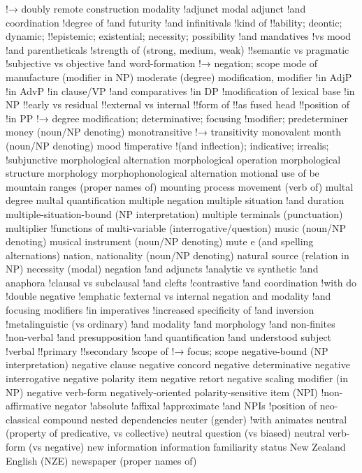 !→ doubly remote construction
modality
!adjunct modal adjunct
!and coordination
!degree of
!and futurity
!and infinitivals
!kind of
!!ability; deontic; dynamic;
!!epistemic; existential; necessity; possibility
!and mandatives
!vs mood
!and parentheticals
!strength of (strong, medium, weak)
!!semantic vs pragmatic
!subjective vs objective
!and word-formation
!→ negation; scope
mode of manufacture (modifier in NP)
moderate (degree)
modification, modifier
!in AdjP
!in AdvP
!in clause/VP
!and comparatives
!in DP
!modification of lexical base
!in NP
!!early vs residual
!!external vs internal
!!form of
!!as fused head
!!position of
!in PP
!→ degree modification; determinative; focusing
!modifier; predeterminer
money (noun/NP denoting)
monotransitive
!→ transitivity
monovalent
month (noun/NP denoting)
mood
!imperative
!(and inflection); indicative; irrealis;
!subjunctive
morphological alternation
morphological operation
morphological structure
morphology
morphophonological alternation
motional use of be
mountain ranges (proper names of)
mounting process
movement (verb of)
multal degree
multal quantification
multiple negation
multiple situation
!and duration
multiple-situation-bound (NP interpretation)
multiple terminals (punctuation)
multiplier
!functions of
multi-variable (interrogative/question)
music (noun/NP denoting)
musical instrument (noun/NP denoting)
mute e (and spelling alternations)
nation, nationality (noun/NP denoting)
natural source (relation in NP)
necessity (modal)
negation
!and adjuncts
!analytic vs synthetic
!and anaphora
!clausal vs subclausal
!and clefts
!contrastive
!and coordination
!with do
!double negative
!emphatic
!external vs internal negation and modality
!and focusing modifiers
!in imperatives
!increased specificity of
!and inversion
!metalinguistic (vs ordinary)
!and modality
!and morphology
!and non-finites
!non-verbal
!and presupposition
!and quantification
!and understood subject
!verbal
!!primary
!!secondary
!scope of
!→ focus; scope
negative-bound (NP interpretation)
negative clause
negative concord
negative determinative
negative interrogative
negative polarity item
negative retort
negative scaling modifier (in NP)
negative verb-form
negatively-oriented polarity-sensitive item (NPI)
!non-affirmative
negator
!absolute
!affixal
!approximate
!and NPIs
!position of
neo-classical compound
nested dependencies
neuter (gender)
!with animates
neutral (property of predicative, vs collective)
neutral question (vs biased)
neutral verb-form (vs negative)
new information information familiarity status
New Zealand English (NZE)
newspaper (proper names of)
